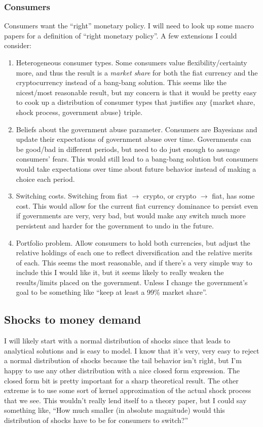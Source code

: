 \documentclass[dvipsnames]{article}
\begin{document}
\subsubsection{Consumers}
Consumers want the ``right'' monetary policy. I will need to look up some macro papers for a definition of ``right monetary policy''. A few extensions I could consider:
\begin{enumerate}
\item Heterogeneous consumer types. Some consumers value flexibility/certainty more, and thus the result is a \emph{market share} for both the fiat currency and the cryptocurrency instead of a bang-bang solution. This seems like the nicest/most reasonable result, but my concern is that it would be pretty easy to cook up a distribution of consumer types that justifies any $\{$market share, shock process, government abuse$\}$ triple.
\item Beliefs about the government abuse parameter. Consumers are Bayesians and update their expectations of government abuse over time. Governments can be good/bad in different periods, but need to do just enough to assuage consumers' fears. This would still lead to a bang-bang solution but consumers would take expectations over time about future behavior instead of making a choice each period.
  \item Switching costs. Switching from fiat $\to$ crypto, or crypto $\to$ fiat, has some cost. This would allow for the current fiat currency dominance to persist even if governments are very, very bad, but would make any switch much more persistent and harder for the government to undo in the future.
    \item Portfolio problem. Allow consumers to hold both currencies, but adjust the relative holdings of each one to reflect diversification and the relative merits of each. This seems the most reasonable, and if there's a very simple way to include this I would like it, but it seems likely to really weaken the results/limits placed on the government. Unless I change the government's goal to be something like ``keep at least a 99\% market share''.
\end{enumerate}

\subsection{Shocks to money demand}
I will likely start with a normal distribution of shocks since that leads to analytical solutions and is easy to model. I know that it's very, very easy to reject a normal distribution of shocks because the tail behavior isn't right, but I'm happy to use any other distribution with a nice closed form expression. The closed form bit is pretty important for a sharp theoretical result. The other extreme is to use some sort of kernel approximation of the actual shock process that we see. This wouldn't really lend itself to a theory paper, but I could say something like, ``How much  smaller (in absolute magnitude) would this distribution of shocks have to be for consumers to switch?''
\end{document}
